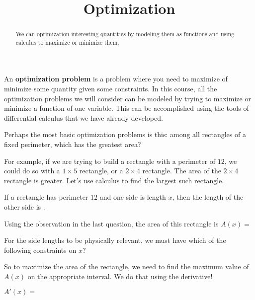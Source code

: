 \documentclass{ximera}
\title{Optimization}
\begin{document}
\begin{abstract}
  We can optimization interesting quantities by modeling them as functions and using calculus to maximize or minimize them.
\end{abstract}

\maketitle


An \textbf{optimization problem} is a problem where you need to maximize of minimize some quantity given some constraints.  In this course, all the optimization problems we will consider can be modeled by trying to maximize or minimize a function of one variable.  This can be accomplished using the tools of differential calculus that we have already developed.

Perhaps the most basic optimization problems is this:  among all rectangles of a fixed perimeter, which has the greatest area?

For example, if we are trying to build a rectangle with a perimeter of $12$, we could do so with a $1 \times 5$ rectangle, or a $2 \times 4$ rectangle.  The area of the $2 \times 4$ rectangle is greater.  Let's use calculus to find the largest such rectangle.

\begin{question}
	If a rectangle has perimeter $12$ and one side is length $x$, then the length of the other side is .
\end{question}

\begin{question}
	Using the observation in the last question, the area of this rectangle is $A(x) =$
\end{question}

\begin{question}
	For the side lengths to be physically relevant, we must have which of the following constraints on $x$?
	\begin{multipleChoice}
  	\end{multipleChoice}
\end{question}

So to maximize the area of the rectangle, we need to find the maximum value of $A(x)$ on the appropriate interval.  We do that using the derivative!

\begin{question}
	$A'(x) =$ 
\end{question}
\end{document}
